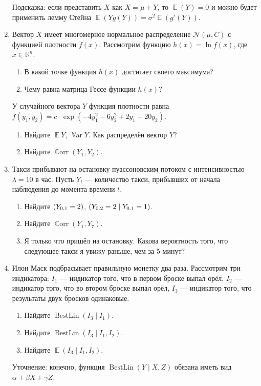 \documentclass[12pt]{article}
\DeclareMathOperator{\BestLin}{BestLin}
\DeclareMathOperator{\Corr}{\mathbb{C}orr}
\DeclareMathOperator{\Var}{\mathbb{V}ar}
\let\P\relax
\DeclareMathOperator{\P}{\mathbb{P}}
\DeclareMathOperator{\E}{\mathbb{E}}
\newcommand \cN{\mathcal{N}}
\newcommand \RR{\mathbb{R}}
\begin{document}
\begin{enumerate}
Подсказка: если представить $X$ как $X = \mu + Y$, то $\E(Y) = 0$ и можно будет применить лемму Стейна $\E(Y g(Y)) = \sigma^2 \E(g'(Y))$.

\item %
Вектор $X$ имеет многомерное нормальное распределение $\cN(\mu, C)$ с функцией плотности $f(x)$.
Рассмотрим функцию $h(x) = \ln f(x)$, где $x\in \RR^n$.
\begin{enumerate}
    \item В какой точке функция $h(x)$ достигает своего максимума?
    \item Чему равна матрица Гессе функции $h(x)$?
\end{enumerate}
У случайного вектора $Y$ функция плотности равна $f(y_1, y_2) = c \cdot \exp(-4y_1^2 - 6y_2^2 + 2y_1 + 20y_2)$.
\begin{enumerate}[resume]
    \item Найдите $\E Y$, $\Var Y$. Как распределён вектор $Y$?
    \item Найдите $\Corr(Y_1, Y_2)$.
\end{enumerate}

\item %
Такси прибывают на остановку пуассоновским потоком с интенсивностью $\lambda = 10$ в час. 
Пусть $Y_t$ — количество такси, прибывших от начала наблюдения до момента времени $t$.
\begin{enumerate}
    \item Найдите $\P(Y_{0.1} = 2)$, $\P(Y_{0.2} = 2 \mid Y_{0.1} = 1)$.
    \item Найдите $\Corr(Y_1, Y_7)$.
    \item Я только что пришёл на остановку. Какова вероятность того, что следующее такси я увижу раньше, чем за 5 минут?
\end{enumerate}

\item %
Илон Маск подбрасывает правильную монетку два раза. 
Рассмотрим три индикатора: $I_1$ — индикатор того, что в первом броске выпал орёл,
$I_2$ — индикатор того, что во втором броске выпал орёл, 
$I_3$ — индикатор того, что результаты двух бросков одинаковые.
\begin{enumerate}
    \item Найдите $\BestLin(I_3 \mid I_1)$.
    \item Найдите $\BestLin(I_3 \mid I_1, I_2)$.
    \item Найдите $\E(I_3 \mid I_1, I_2)$.
\end{enumerate}

Уточнение: конечно, функция $\BestLin(Y \mid X, Z)$ обязана иметь вид $\alpha + \beta X + \gamma Z$.

\end{enumerate}
\end{document}
